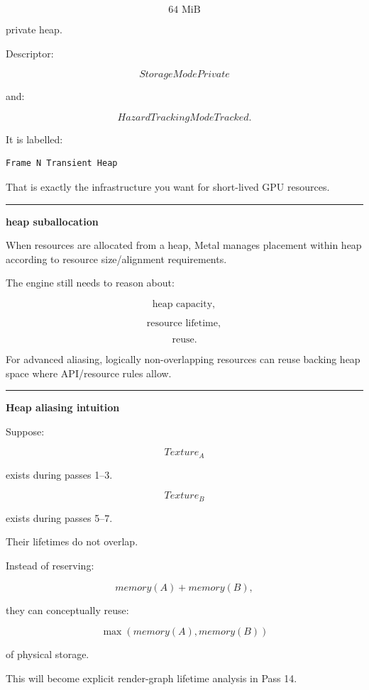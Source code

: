 \[
64\text{ MiB}
\]

private heap.

Descriptor:

\[
StorageModePrivate
\]

and:

\[
HazardTrackingModeTracked.
\]

It is labelled:

\begin{verbatim}
Frame N Transient Heap
\end{verbatim}

That is exactly the infrastructure you want for short-lived GPU resources.

\begin{center}\rule{0.5\linewidth}{0.5pt}\end{center}

\textbf{heap suballocation}

When resources are allocated from a heap, Metal manages placement within heap according to resource size/alignment requirements.

The engine still needs to reason about:

\[
\text{heap capacity},
\]

\[
\text{resource lifetime},
\]

\[
\text{reuse}.
\]

For advanced aliasing, logically non-overlapping resources can reuse backing heap space where API/resource rules allow.

\begin{center}\rule{0.5\linewidth}{0.5pt}\end{center}

\textbf{Heap aliasing intuition}

Suppose:

\[
Texture_A
\]

exists during passes 1--3.

\[
Texture_B
\]

exists during passes 5--7.

Their lifetimes do not overlap.

Instead of reserving:

\[
memory(A)+memory(B),
\]

they can conceptually reuse:

\[
\max(memory(A),memory(B))
\]

of physical storage.

This will become explicit render-graph lifetime analysis in Pass 14.

